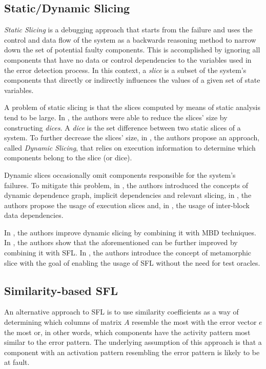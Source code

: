 \subsection*{Static/Dynamic Slicing}
\emph{Static Slicing} \citep{Weiser82,Weiser84} is a debugging
approach that starts from the failure and uses the control and data
flow of the system as a backwards reasoning method to narrow down the
set of potential faulty components.
%
This is accomplished by ignoring all components that have no data or
control dependencies to the variables used in the error detection
process.
%
In this context, a \emph{slice} is a subset of the system's components
that directly or indirectly influences the values of a given set of
state variables.
%

A problem of static slicing is that the slices computed by means of
static analysis tend to be large.
%
In \citep{Lyle87}, the authors were able to reduce the slices' size by
constructing \emph{dices}.
%
A \emph{dice} is the set difference between two static slices of a
system.
%
To further decrease the slices' size, in \citep{Kolettis95}, the
authors propose an approach, called \emph{Dynamic Slicing}, that
relies on execution information to determine which components belong
to the slice (or dice).

Dynamic slices occasionally omit components responsible for the
system's failures.
%
To mitigate this problem, in \citep{Zhang04,Zhang05,Zhang07}, the
authors introduced the concepts of dynamic dependence graph, implicit
dependencies and relevant slicing, in \citep{Agrawal95}, the authors
propose the usage of execution slices and, in \citep{Wong06}, the
usage of inter-block data dependencies.

In \citep{Wotawa10}, the authors improve dynamic slicing by combining
it with \ac{MBD} techniques.
%
In \citep{Hofer12}, the authors show that the aforementioned can be
further improved by combining it with \ac{SFL}.
%
In \citep{Xie10,Xie13}, the authors introduce the concept of
metamorphic slice with the goal of enabling the usage of \ac{SFL}
without the need for test oracles.


\subsection*{Similarity-based \acs{SFL}}
\label{sec:related-work:similarity-based-SFL}
An alternative approach to \ac{SFL} is to use similarity coefficients
as a way of determining which columns of matrix $A$ resemble the most
with the error vector $e$ the most or, in other words, which
components have the activity pattern most similar to the error
pattern.
%
The underlying assumption of this approach is that a component with an
activation pattern resembling the error pattern is likely to be at
fault.

